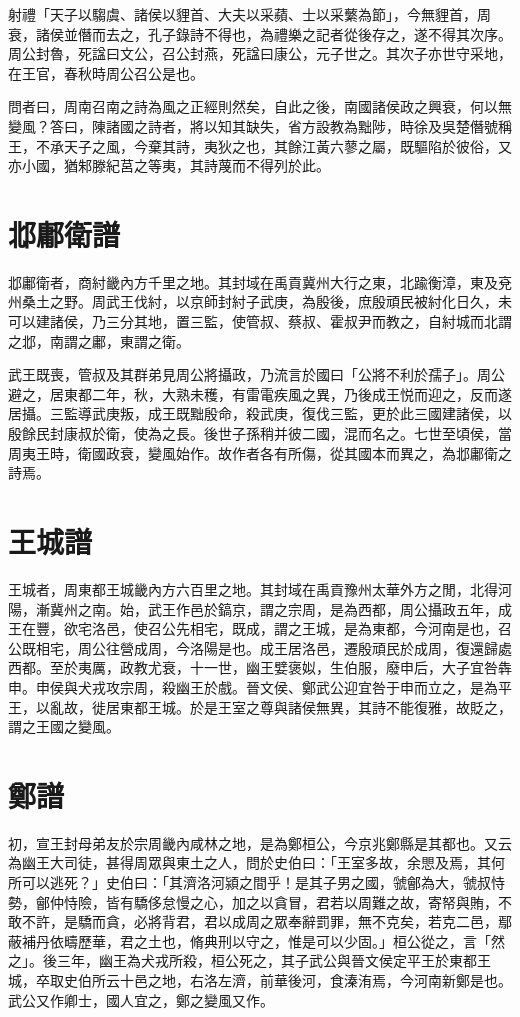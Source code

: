 射禮「天子以騶虞、諸侯以貍首、大夫以采蘋、士以采蘩為節」，今無貍首，周衰，諸侯並僭而去之，孔子錄詩不得也，為禮樂之記者從後存之，遂不得其次序。周公封魯，死諡曰文公，召公封燕，死諡曰康公，元子世之。其次子亦世守采地，在王官，春秋時周公召公是也。

問者曰，周南召南之詩為風之正經則然矣，自此之後，南國諸侯政之興衰，何以無變風？答曰，陳諸國之詩者，將以知其缺失，省方設教為黜陟，時徐及吳楚僭號稱王，不承天子之風，今棄其詩，夷狄之也，其餘江黃六蓼之屬，既驅陷於彼俗，又亦小國，猶邾滕紀莒之等夷，其詩蔑而不得列於此。

\section*{邶鄘衛譜}

邶鄘衛者，商紂畿內方千里之地。其封域在禹貢冀州大行之東，北踰衡漳，東及兗州桑土之野。周武王伐紂，以京師封紂子武庚，為殷後，庶殷頑民被紂化日久，未可以建諸侯，乃三分其地，置三監，使管叔、蔡叔、霍叔尹而教之，自紂城而北謂之邶，南謂之鄘，東謂之衛。

武王既喪，管叔及其群弟見周公將攝政，乃流言於國曰「公將不利於孺子」。周公避之，居東都二年，秋，大熟未穫，有雷電疾風之異，乃後成王悦而迎之，反而遂居攝。三監導武庚叛，成王既黜殷命，殺武庚，復伐三監，更於此三國建諸侯，以殷餘民封康叔於衛，使為之長。後世子孫稍并彼二國，混而名之。七世至頃侯，當周夷王時，衛國政衰，變風始作。故作者各有所傷，從其國本而異之，為邶鄘衛之詩焉。

\section*{王城譜}

王城者，周東都王城畿內方六百里之地。其封域在禹貢豫州太華外方之閒，北得河陽，漸冀州之南。始，武王作邑於鎬京，謂之宗周，是為西都，周公攝政五年，成王在豐，欲宅洛邑，使召公先相宅，既成，謂之王城，是為東都，今河南是也，召公既相宅，周公往營成周，今洛陽是也。成王居洛邑，遷殷頑民於成周，復還歸處西都。至於夷厲，政教尤衰，十一世，幽王嬖褒姒，生伯服，廢申后，大子宜咎犇申。申侯與犬戎攻宗周，殺幽王於戲。晉文侯、鄭武公迎宜咎于申而立之，是為平王，以亂故，徙居東都王城。於是王室之尊與諸侯無異，其詩不能復雅，故貶之，謂之王國之變風。

\section*{鄭譜}

初，宣王封母弟友於宗周畿內咸林之地，是為鄭桓公，今京兆鄭縣是其都也。又云為幽王大司徒，甚得周眾與東土之人，問於史伯曰：「王室多故，余愳及焉，其何所可以逃死？」史伯曰：「其濟洛河潁之間乎！是其子男之國，虢鄶為大，虢叔恃勢，鄶仲恃險，皆有驕侈怠慢之心，加之以貪冒，君若以周難之故，寄帑與賄，不敢不許，是驕而貪，必將背君，君以成周之眾奉辭罰罪，無不克矣，若克二邑，鄢蔽補丹依疇歷華，君之土也，脩典刑以守之，惟是可以少固。」桓公從之，言「然之」。後三年，幽王為犬戎所殺，桓公死之，其子武公與晉文侯定平王於東都王城，卒取史伯所云十邑之地，右洛左濟，前華後河，食溱洧焉，今河南新鄭是也。武公又作卿士，國人宜之，鄭之變風又作。

